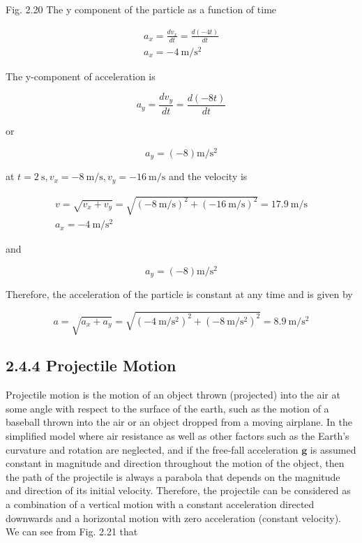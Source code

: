 \documentclass[10pt]{article}
\begin{document}
Fig. 2.20 The y component of the particle as a function of time

$$
\begin{gathered}
a_{x}=\frac{d v_{x}}{d t}=\frac{d(-4 t)}{d t} \\
a_{x}=-4 \mathrm{~m} / \mathrm{s}^{2}
\end{gathered}
$$

The y-component of acceleration is

$$
a_{y}=\frac{d v_{y}}{d t}=\frac{d(-8 t)}{d t}
$$

or

$$
a_{y}=(-8) \mathrm{m} / \mathrm{s}^{2}
$$

at $t=2 \mathrm{~s}, v_{x}=-8 \mathrm{~m} / \mathrm{s}, v_{y}=-16 \mathrm{~m} / \mathrm{s}$ and the velocity is

$$
\begin{gathered}
v=\sqrt{v_{x}+v_{y}}=\sqrt{(-8 \mathrm{~m} / \mathrm{s})^{2}+(-16 \mathrm{~m} / \mathrm{s})^{2}}=17.9 \mathrm{~m} / \mathrm{s} \\
a_{x}=-4 \mathrm{~m} / \mathrm{s}^{2}
\end{gathered}
$$

and

$$
a_{y}=(-8) \mathrm{m} / \mathrm{s}^{2}
$$

Therefore, the acceleration of the particle is constant at any time and is given by

$$
a=\sqrt{a_{x}+a_{y}}=\sqrt{\left(-4 \mathrm{~m} / \mathrm{s}^{2}\right)^{2}+\left(-8 \mathrm{~m} / \mathrm{s}^{2}\right)^{2}}=8.9 \mathrm{~m} / \mathrm{s}^{2}
$$

\subsection*{2.4.4 Projectile Motion}
Projectile motion is the motion of an object thrown (projected) into the air at some angle with respect to the surface of the earth, such as the motion of a baseball thrown into the air or an object dropped from a moving airplane. In the simplified model where air resistance as well as other factors such as the Earth's curvature and rotation are neglected, and if the free-fall acceleration $\mathbf{g}$ is assumed constant in magnitude and direction throughout the motion of the object, then the path of the projectile is always a parabola that depends on the magnitude and direction of its initial velocity. Therefore, the projectile can be considered as a combination of a vertical motion with a constant acceleration directed downwards and a horizontal motion with zero acceleration (constant velocity). We can see from Fig. 2.21 that
\end{document}
